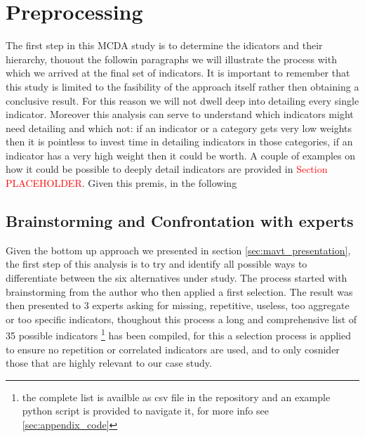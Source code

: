\section{Preprocessing}
The first step in this MCDA study is to determine the idicators and their hierarchy, thouout the followin paragraphs we will illustrate the process with which we arrived at the final set of indicators. It is important to remember that this study is limited to the fasibility of the approach itself rather then obtaining a conclusive result. For this reason we will not dwell deep into detailing every single indicator. Moreover this analysis can serve to understand which indicators might need detailing and which not: if an indicator or a category gets very low weights then it is pointless to invest time in detailing indicators in those categories, if an indicator has a very high weight then it could be worth. A couple of examples on how it could be possible to deeply detail indicators are provided in \textcolor{red}{Section PLACEHOLDER}. Given this premis, in the following 

\subsection{Brainstorming and Confrontation with experts}
\label{sec:brainstorming_indicators}
Given the bottom up approach we presented in section \ref{sec:mavt_presentation}, the first step of this analysis is to try and identify all possible ways to differentiate between the six alternatives under study. The process started with brainstorming from the author who then applied a first selection. The result was then presented to 3 experts asking for missing, repetitive, useless, too aggregate or too specific indicators, thoughout this process a long and comprehensive list of 35 possible indicators \footnote{the complete list is availble as csv file in the repository and an example python script is provided to navigate it, for more info see \ref{sec:appendix_code}} has been compiled, for this a selection process is applied to ensure no repetition or correlated indicators are used, and to only cosnider those that are highly relevant to our case study.


